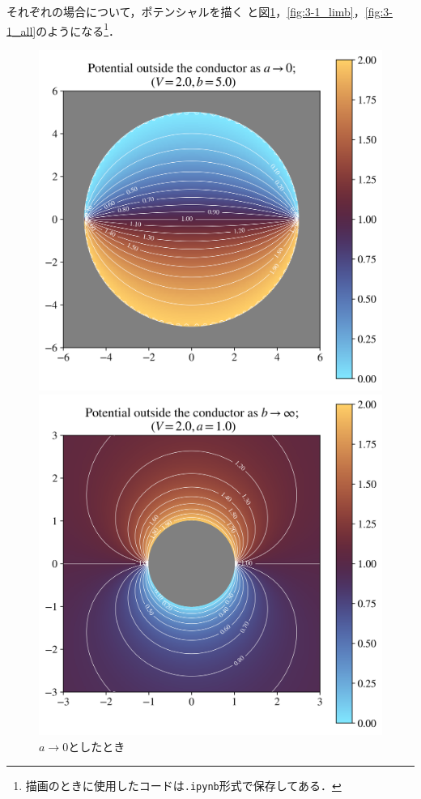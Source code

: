 それぞれの場合について，ポテンシャルを描く
と図\ref{fig:3-1_lima}，\ref{fig:3-1_limb}，\ref{fig:3-1_all}のようになる\footnote{
  描画のときに使用したコードは\texttt{.ipynb}形式で保存してある．
}．
\begin{figure}[htbp]%
  \centering%
  \begin{minipage}{0.30\linewidth}
    \centering
    \includegraphics[width=\linewidth]{py/3-1_lima.png}%
    \caption{$a \to 0$としたとき}%
    \label{fig:3-1_lima}%
  \end{minipage}
  \begin{minipage}{0.30\linewidth}
    \centering
    \includegraphics[width=\linewidth]{py/3-1_limb.png}%

\end{minipage}
\end{figure}
